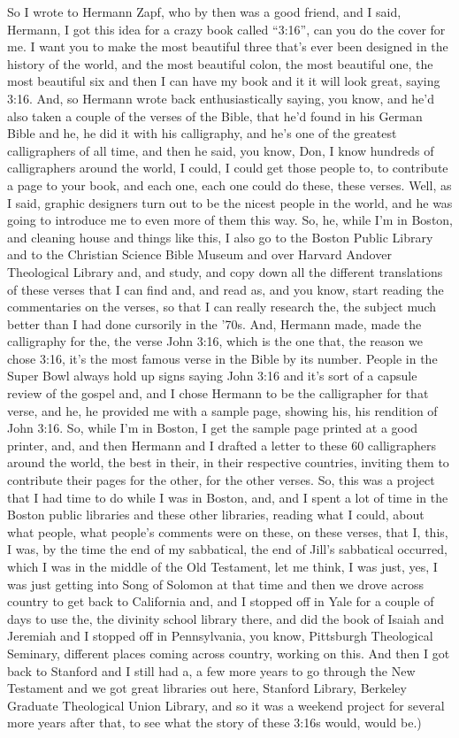 \documentclass[]{article}
\begin{document}
So I wrote to Hermann Zapf, who by then was a good friend, and I said,
Hermann, I got this idea for a crazy book called ``3:16'', can you do
the cover for me. I want you to make the most beautiful three that's
ever been designed in the history of the world, and the most beautiful
colon, the most beautiful one, the most beautiful six and then I can
have my book and it it will look great, saying 3:16. And, so Hermann
wrote back enthusiastically saying, you know, and he'd also taken a
couple of the verses of the Bible, that he'd found in his German Bible
and he, he did it with his calligraphy, and he's one of the greatest
calligraphers of all time, and then he said, you know, Don, I know
hundreds of calligraphers around the world, I could, I could get those
people to, to contribute a page to your book, and each one, each one
could do these, these verses. Well, as I said, graphic designers turn
out to be the nicest people in the world, and he was going to introduce
me to even more of them this way. So, he, while I'm in Boston, and
cleaning house and things like this, I also go to the Boston Public
Library and to the Christian Science Bible Museum and over Harvard
Andover Theological Library and, and study, and copy down all the
different translations of these verses that I can find and, and read as,
and you know, start reading the commentaries on the verses, so that I
can really research the, the subject much better than I had done
cursorily in the '70s. And, Hermann made, made the calligraphy for the,
the verse John 3:16, which is the one that, the reason we chose 3:16,
it's the most famous verse in the Bible by its number. People in the
Super Bowl always hold up signs saying John 3:16 and it's sort of a
capsule review of the gospel and, and I chose Hermann to be the
calligrapher for that verse, and he, he provided me with a sample page,
showing his, his rendition of John 3:16. So, while I'm in Boston, I get
the sample page printed at a good printer, and, and then Hermann and I
drafted a letter to these 60 calligraphers around the world, the best in
their, in their respective countries, inviting them to contribute their
pages for the other, for the other verses. So, this was a project that I
had time to do while I was in Boston, and, and I spent a lot of time in
the Boston public libraries and these other libraries, reading what I
could, about what people, what people's comments were on these, on these
verses, that I, this, I was, by the time the end of my sabbatical, the
end of Jill's sabbatical occurred, which I was in the middle of the Old
Testament, let me think, I was just, yes, I was just getting into Song
of Solomon at that time and then we drove across country to get back to
California and, and I stopped off in Yale for a couple of days to use
the, the divinity school library there, and did the book of Isaiah and
Jeremiah and I stopped off in Pennsylvania, you know, Pittsburgh
Theological Seminary, different places coming across country, working on
this. And then I got back to Stanford and I still had a, a few more
years to go through the New Testament and we got great libraries out
here, Stanford Library, Berkeley Graduate Theological Union Library, and
so it was a weekend project for several more years after that, to see
what the story of these 3:16s would, would be.)
\end{document}
